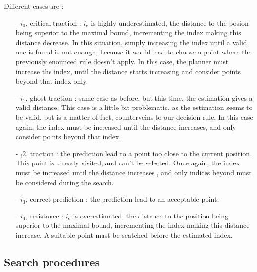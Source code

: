 Different cases are : 
\begin{itemize}

\item [-] $i_0$, critical traction : $i_e$ is highly underestimated, the distance to the posion being
superior to the maximal bound, incrementing the index making this distance decrease. In this situation, simply
increasing the index until a valid one is found is not enough, because it would lead to choose a point where
the previously enounced rule doesn't apply. In this case, the planner must increase the index, until the 
distance starts increasing and consider points beyond that index only.

\item [-] $i_1$, ghost traction : same case as before, but this time, the estimation gives a valid distance. 
This case is a little bit problematic, as the estimation seems to be valid, but is a matter of fact, 
counterveins to our decision rule. In this case again, the index must be increased until the distance 
increases, and only consider points beyond that index.

\item [-] $_i2$, traction : the prediction lead to a point too close to the current position. This point is 
already visited, and can't be selected. Once again, the index must be increased until the distance increases
, and only indices beyond must be considered during the search.

\item [-] $i_3$, correct prediction : the prediction lead to an acceptable point.

\item [-] $i_4$, resistance : $i_e$ is overestimated, the distance to the position being superior to the
maximal bound, incrementing the index making this distance increase. A suitable point must be seatched before
the estimated index.

\end{itemize}

\newpage

\subsection{Search procedures}

